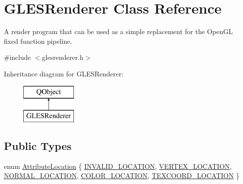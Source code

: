 \hypertarget{class_g_l_e_s_renderer}{}\section{G\+L\+E\+S\+Renderer Class Reference}
\label{class_g_l_e_s_renderer}


A render program that can be used as a simple replacement for the Open\+GL fixed function pipeline.  




{\ttfamily \#include $<$glesrenderer.\+h$>$}

Inheritance diagram for G\+L\+E\+S\+Renderer\+:\begin{figure}[H]
\begin{center}
\leavevmode
\includegraphics[height=2.000000cm]{class_g_l_e_s_renderer}
\end{center}
\end{figure}
\subsection*{Public Types}
\begin{DoxyCompactItemize}
\item 
enum \mbox{\hyperlink{class_g_l_e_s_renderer_a05f4cf233d5cf60f4d6ea50ddc06a2c4}{Attribute\+Location}} \{ \newline
\mbox{\hyperlink{class_g_l_e_s_renderer_a05f4cf233d5cf60f4d6ea50ddc06a2c4a01a2d548e2a6b32401c8140d8d2d4edb}{I\+N\+V\+A\+L\+I\+D\+\_\+\+L\+O\+C\+A\+T\+I\+ON}}, 
\mbox{\hyperlink{class_g_l_e_s_renderer_a05f4cf233d5cf60f4d6ea50ddc06a2c4a9a193465ebcf7cb50c52579e5faccfa1}{V\+E\+R\+T\+E\+X\+\_\+\+L\+O\+C\+A\+T\+I\+ON}}, 
\mbox{\hyperlink{class_g_l_e_s_renderer_a05f4cf233d5cf60f4d6ea50ddc06a2c4a5b0069ee1cbe3a7f59c894fea0bb87f4}{N\+O\+R\+M\+A\+L\+\_\+\+L\+O\+C\+A\+T\+I\+ON}}, 
\mbox{\hyperlink{class_g_l_e_s_renderer_a05f4cf233d5cf60f4d6ea50ddc06a2c4a12d6a9758e29fa479c6f2b3fd2204802}{C\+O\+L\+O\+R\+\_\+\+L\+O\+C\+A\+T\+I\+ON}}, 
\newline
\mbox{\hyperlink{class_g_l_e_s_renderer_a05f4cf233d5cf60f4d6ea50ddc06a2c4a664e56a457a0171c04883330689c283f}{T\+E\+X\+C\+O\+O\+R\+D\+\_\+\+L\+O\+C\+A\+T\+I\+ON}}
 \}
\end{DoxyCompactItemize}
